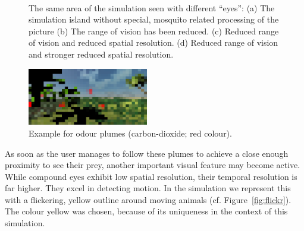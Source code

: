 \documentclass{sig-alternate-05-2015}
\begin{document}
\begin{figure}[ht!]
{}
\\

\caption{The same area of the simulation seen with different ``eyes'': (a) The simulation island without special, mosquito related processing of the picture (b) The range of vision has been reduced. (c) Reduced range of vision and reduced spatial resolution. (d) Reduced range of vision and stronger reduced spatial resolution.}
\label{fig:vision}
\end{figure}

\begin{figure}[ht!]
\includegraphics[width=0.47\textwidth]{Figures/co2.png}
\caption{Example for odour plumes (carbon-dioxide; red colour).}
\label{fig:co2}
\end{figure}
\vspace{3pt}

As soon as the user manages to follow these plumes to achieve a close enough proximity to see their prey, another important visual feature may become active. While compound eyes exhibit low spatial resolution, their temporal resolution is far higher. They excel in detecting motion. In the simulation we represent this with a flickering, yellow outline around moving animals (cf. Figure~\ref{fig:flickr}). The colour yellow was chosen, because of its uniqueness in the context of this simulation.
\end{document}
